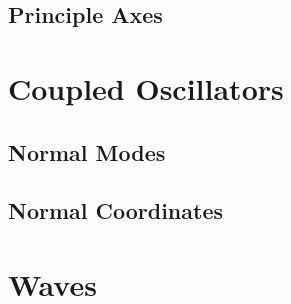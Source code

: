 \documentclass[main.tex]{subfiles}
\begin{document}
\subsection{Principle Axes}

\section{Coupled Oscillators}

\subsection{Normal Modes}

\subsection{Normal Coordinates}

\section{Waves}
\end{document}
